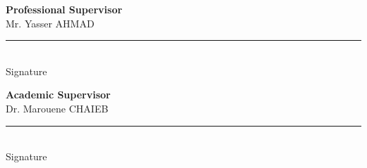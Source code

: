 
\thispagestyle{empty}
\vspace*{5cm}

\noindent
\begin{minipage}[t]{0.48\textwidth}
\centering
\textbf{Professional Supervisor}\\[4pt]
Mr. Yasser AHMAD\\[2.4cm]
\rule{5.5cm}{0.4pt}\\[2pt]
{\small Signature}
\end{minipage}
\hfill
\begin{minipage}[t]{0.48\textwidth}
\centering
\textbf{Academic Supervisor}\\[4pt]
Dr. Marouene CHAIEB\\[2.4cm]
\rule{5.5cm}{0.4pt}\\[2pt]
{\small Signature}
\end{minipage}
